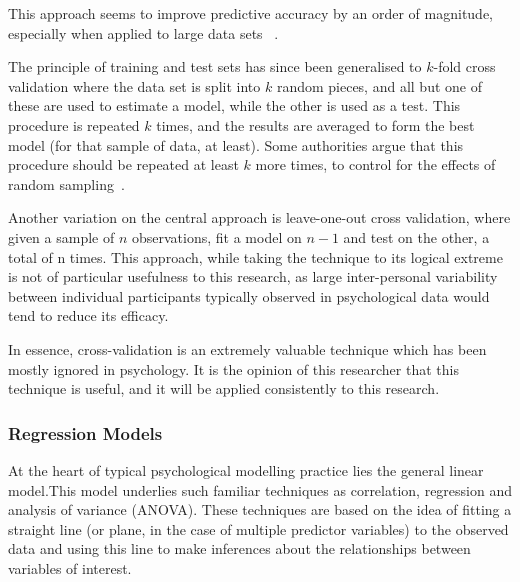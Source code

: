 This approach seems to improve predictive accuracy by an order of  magnitude, especially when applied to large data sets ~\cite{breiman2001statistical}.  

The principle of training and test sets has since been generalised to $k$-fold cross validation where the data set is split into $k$ random pieces, and all but one of these are used to estimate a model, while the other is used as a test. This procedure is repeated $k$ times, and the results are averaged to form the best model (for that sample of data, at least). Some authorities argue that this procedure should be repeated at least $k$ more times, to control for the effects of random sampling~\cite{friedman2009elements}.

Another variation on the central approach is leave-one-out cross validation, where given a sample of $n$ observations, fit a model on $n-1$ and test on the other, a total of n times. This approach, while taking the technique to its logical extreme is not of particular usefulness to this research, as large inter-personal variability between individual participants typically observed in psychological data would tend to reduce its efficacy\cite{friedman2009elements}. %

In essence, cross-validation is an extremely valuable technique which has been mostly ignored in psychology. It is the opinion of this researcher  that this technique is useful, and it will be applied consistently to this research.

\subsubsection{Regression Models}
\label{sec:regress-models}

At the heart of typical psychological modelling practice lies the general linear model.This model underlies such familiar techniques as correlation, regression and analysis of variance (ANOVA)\cite{gelman2007data}. These techniques are based on the idea of fitting a straight line (or plane, in the case of multiple predictor variables) to the observed data and using this line to make inferences about the relationships between variables of interest.



